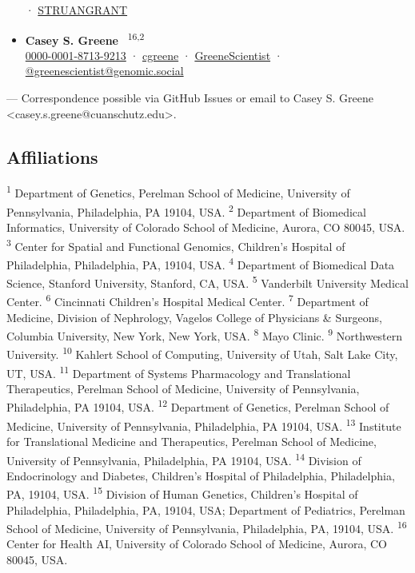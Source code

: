 \documentclass[
  a4paper,
]{article}
\begin{document}
\begin{itemize}
  · 
  \href{https://twitter.com/STRUANGRANT}{STRUANGRANT}
\item
  \textbf{Casey S. Greene}~\textsuperscript{\protect\hyperlink{correspondence}{\Letter}} \textsuperscript{16,2} \\
  
  \href{https://orcid.org/0000-0001-8713-9213}{0000-0001-8713-9213}
  · 
  \href{https://github.com/cgreene}{cgreene}
  · 
  \href{https://twitter.com/GreeneScientist}{GreeneScientist}
  · 
  \href{https://genomic.social/@greenescientist}{@greenescientist@genomic.social}
\end{itemize}

\leavevmode{}%
{\Letter} --- Correspondence possible via GitHub Issues
or email to
Casey S. Greene \textless casey.s.greene@cuanschutz.edu\textgreater.

\hypertarget{affiliations}{%
\subsection{Affiliations}\label{affiliations}}

\textsuperscript{1} Department of Genetics, Perelman School of Medicine, University of Pennsylvania, Philadelphia, PA 19104, USA.
\textsuperscript{2} Department of Biomedical Informatics, University of Colorado School of Medicine, Aurora, CO 80045, USA.
\textsuperscript{3} Center for Spatial and Functional Genomics, Children's Hospital of Philadelphia, Philadelphia, PA, 19104, USA.
\textsuperscript{4} Department of Biomedical Data Science, Stanford University, Stanford, CA, USA.
\textsuperscript{5} Vanderbilt University Medical Center.
\textsuperscript{6} Cincinnati Children's Hospital Medical Center.
\textsuperscript{7} Department of Medicine, Division of Nephrology, Vagelos College of Physicians \& Surgeons, Columbia University, New York, New York, USA.
\textsuperscript{8} Mayo Clinic.
\textsuperscript{9} Northwestern University.
\textsuperscript{10} Kahlert School of Computing, University of Utah, Salt Lake City, UT, USA.
\textsuperscript{11} Department of Systems Pharmacology and Translational Therapeutics, Perelman School of Medicine, University of Pennsylvania, Philadelphia, PA 19104, USA.
\textsuperscript{12} Department of Genetics, Perelman School of Medicine, University of Pennsylvania, Philadelphia, PA 19104, USA.
\textsuperscript{13} Institute for Translational Medicine and Therapeutics, Perelman School of Medicine, University of Pennsylvania, Philadelphia, PA 19104, USA.
\textsuperscript{14} Division of Endocrinology and Diabetes, Children's Hospital of Philadelphia, Philadelphia, PA, 19104, USA.
\textsuperscript{15} Division of Human Genetics, Children's Hospital of Philadelphia, Philadelphia, PA, 19104, USA; Department of Pediatrics, Perelman School of Medicine, University of Pennsylvania, Philadelphia, PA, 19104, USA.
\textsuperscript{16} Center for Health AI, University of Colorado School of Medicine, Aurora, CO 80045, USA.
\end{document}
